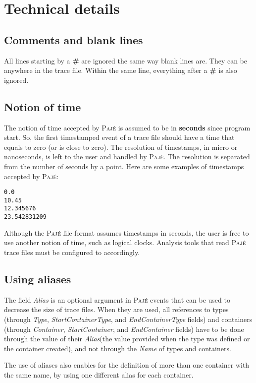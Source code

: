 \documentclass[12pt]{article}
\newcommand{\Paje}{\textsc{Paj\'e}\xspace}
\newcommand{\PajeField}[1]{\emph{#1}\xspace}
\newcommand{\Name}{\PajeField{Name}}
\newcommand{\Type}{\PajeField{Type}}
\newcommand{\Container}{\PajeField{Container}}
\newcommand{\StartContainerType}{\PajeField{StartContainerType}}
\newcommand{\EndContainerType}{\PajeField{EndContainerType}}
\newcommand{\Alias}{\PajeField{Alias}}
\newcommand{\EndContainer}{\PajeField{EndContainer}}
\newcommand{\StartContainer}{\PajeField{StartContainer}}
\begin{document}
\section{Technical details}
\label{s.Technical}

\subsection{Comments and blank lines}

All lines starting by a {\bf \#} are ignored the same way blank lines
are. They can be anywhere in the trace file. Within the same line,
everything after a {\bf \#} is also ignored.

\subsection{Notion of time}
\label{s.NotionOfTime}

The notion of time accepted by \Paje is assumed to be in {\bf seconds}
since program start. So, the first timestamped event of a trace file
should have a time that equals to zero (or is close to zero). The
resolution of timestamps, in micro or nanoseconds, is left to the user
and handled by \Paje. The resolution is separated from the number of
seconds by a point.  Here are some examples of timestamps accepted by
\Paje:

\begin{verbatim}
0.0
10.45
12.345676
23.542831209
\end{verbatim}

Although the \Paje file format assumes timestamps in seconds, the user
is free to use another notion of time, such as logical
clocks. Analysis tools that read \Paje trace files must be configured
to accordingly.


\subsection{Using aliases}
\label{s.Alias}
The field \Alias is an optional argument in \Paje events that can be
used to decrease the size of trace files. When they are used, all
references to types (through \Type, \StartContainerType, and
\EndContainerType fields) and containers (through \Container,
\StartContainer, and \EndContainer fields) have to be done through the
value of their \Alias (the value provided when the type was defined or
the container created), and not through the \Name of types and
containers.

The use of aliases also enables for the definition of more than one
container with the same name, by using one different alias for each
container.
\end{document}

